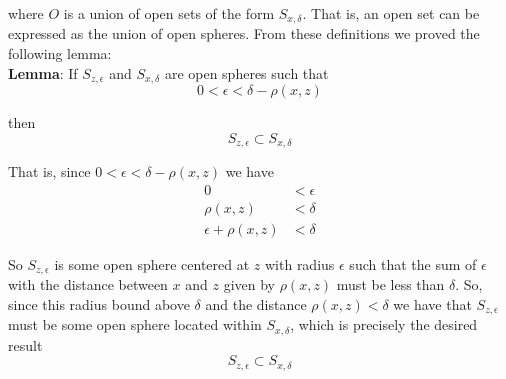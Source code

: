 \documentclass[12pt]{article}
\newlength\tindent
\renewcommand{\indent}{\hspace*{\tindent}}
\begin{document}
where $O$ is a union of open sets of the form $S_{x,\delta}$. That is, an open set can be expressed as the union of open spheres. From these definitions we proved the following lemma: \\

%
%
{\bf Lemma}: If $S_{z,\epsilon}$ and $S_{x, \delta}$ are open spheres such that 
\begin{equation*}
	0 < \epsilon < \delta - \rho(x, z) 
\end{equation*}

then
\begin{equation*}
	S_{z,\epsilon} \subset S_{x,\delta}
\end{equation*}

That is, since $0 < \epsilon < \delta - \rho(x, z)$ we have
\begin{align*}
	0 &< \epsilon \\
	\rho(x, z) &< \delta \\
	\epsilon + \rho(x, z) &< \delta
\end{align*}

\indent So $S_{z, \epsilon}$ is some open sphere centered at $z$ with radius $\epsilon$ such that the sum of $\epsilon$ with the distance between $x$ and $z$ given by $\rho(x, z)$ must be less than $\delta$. So, since this radius bound above $\delta$ and the distance $\rho(x, z) < \delta$ we have that $S_{z,\epsilon}$ must be some open sphere located within $S_{x,\delta}$, which is precisely the desired result
\begin{equation*}
	S_{z,\epsilon} \subset S_{x,\delta}
\end{equation*}
\end{document}
